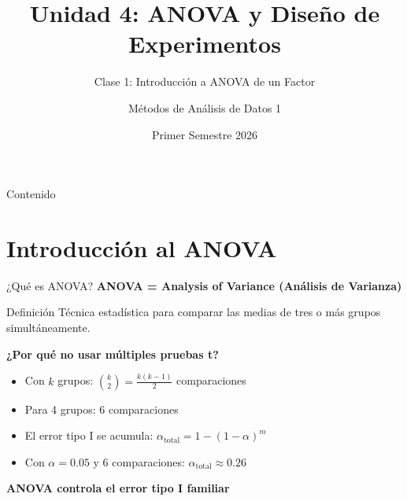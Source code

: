 \documentclass[10pt,aspectratio=169]{beamer}
\title[ANOVA I]{Unidad 4: ANOVA y Diseño de Experimentos}
\subtitle{Clase 1: Introducción a ANOVA de un Factor}
\author{Métodos de Análisis de Datos 1}
\institute{Departamento de Matemática \\ Universidad Nacional del Sur}
\date{Primer Semestre 2026}
\begin{document}
\begin{frame}
\titlepage
\end{frame}

\begin{frame}{Contenido}
\tableofcontents
\end{frame}

\section{Introducción al ANOVA}

\begin{frame}{¿Qué es ANOVA?}
\textbf{ANOVA = Analysis of Variance (Análisis de Varianza)}

\vspace{0.5cm}

\begin{block}{Definición}
Técnica estadística para comparar las medias de \alert{tres o más grupos} simultáneamente.
\end{block}

\vspace{0.3cm}

\textbf{¿Por qué no usar múltiples pruebas t?}
\begin{itemize}
    \item Con $k$ grupos: $\binom{k}{2} = \frac{k(k-1)}{2}$ comparaciones
    \item Para 4 grupos: 6 comparaciones
    \item El error tipo I se acumula: $\alpha_{\text{total}} = 1 - (1-\alpha)^m$
    \item Con $\alpha = 0.05$ y 6 comparaciones: $\alpha_{\text{total}} \approx 0.26$
\end{itemize}

\vspace{0.2cm}
\textbf{ANOVA controla el error tipo I familiar}
\end{frame}
\end{document}
